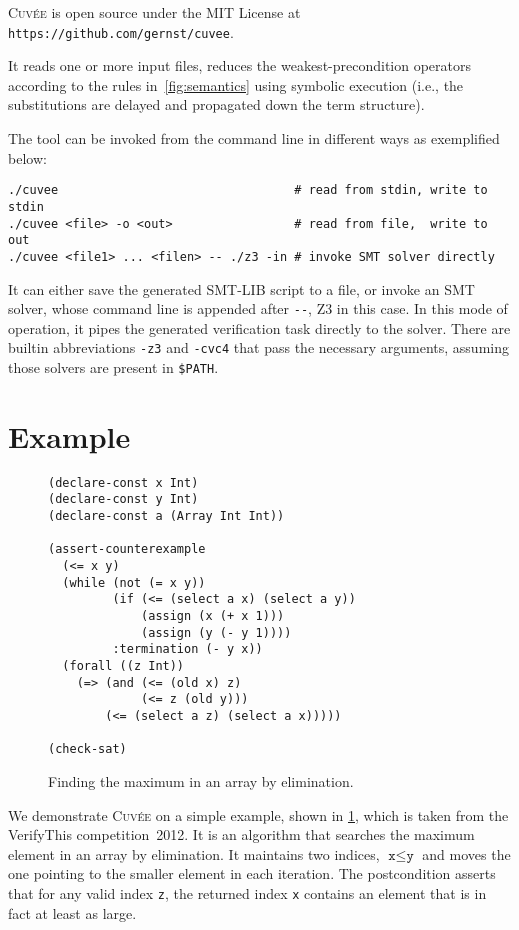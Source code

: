 \documentclass[fleqn]{llncs}
\newcommand{\Cuvee}{\textsc{Cuvée}\xspace}
\newcommand{\code}[1]{\texttt{#1}}
\begin{document}
\Cuvee is open source under the MIT License at \code{https://github.com/gernst/cuvee}.

It reads one or more input files, reduces the weakest-precondition operators according to the rules in~\cref{fig:semantics}
using symbolic execution (i.e., the substitutions are delayed and propagated down the term structure).

The tool can be invoked from the command line in different ways
as exemplified below:
\begin{verbatim}
./cuvee                                 # read from stdin, write to stdin
./cuvee <file> -o <out>                 # read from file,  write to out
./cuvee <file1> ... <filen> -- ./z3 -in # invoke SMT solver directly
\end{verbatim}
It can either save the generated SMT-LIB script to a file,
or invoke an SMT solver, whose command line is appended after \verb|--|, Z3 in this case.
In this mode of operation, it pipes the generated verification task directly to the solver.
There are builtin abbreviations \verb|-z3| and \verb|-cvc4| that pass the necessary arguments,
assuming those solvers are present in \verb|$PATH|.

\section{Example}

\begin{figure}[t]
\begin{verbatim}
(declare-const x Int)
(declare-const y Int)
(declare-const a (Array Int Int))

(assert-counterexample
  (<= x y)
  (while (not (= x y))
         (if (<= (select a x) (select a y))
             (assign (x (+ x 1)))
             (assign (y (- y 1))))
         :termination (- y x))
  (forall ((z Int))
    (=> (and (<= (old x) z)
             (<= z (old y)))
        (<= (select a z) (select a x)))))

(check-sat)
\end{verbatim}
\caption{Finding the maximum in an array by elimination.}
\label{fig:example}
\end{figure}

We demonstrate \Cuvee on a simple example, shown in \cref{fig:example},
which is taken from the VerifyThis competition~2012.
It is an algorithm that searches the maximum element in an array by elimination.
It maintains two indices, $\code{x} \le \code{y}$
and moves the one pointing to the smaller element in each iteration.
The postcondition asserts that for any valid index \code{z},
the returned index \code{x} contains an element that is in fact at least as large.
\end{document}
